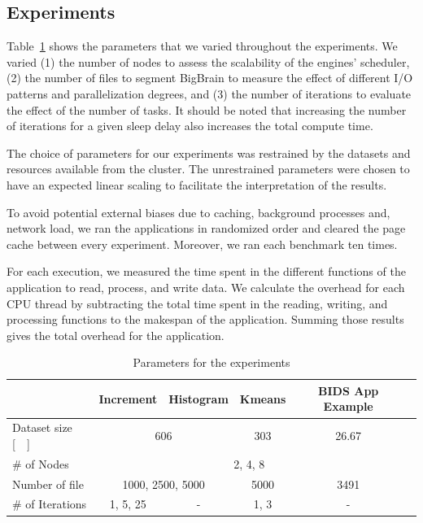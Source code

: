 \documentclass[AMA,STIX1COL]{WileyNJD-v2}
\newcommand{\HL}[1]{#1}
\begin{document}
\subsection{Experiments}
Table~\ref{table:parameters} shows the parameters that we varied
throughout the experiments. We varied (1) the number of nodes to assess
the scalability of the engines' scheduler, (2) the number of files \HL{to segment}
BigBrain to measure the effect of different I/O patterns and parallelization degrees, and (3) the
number of iterations to evaluate the effect of the number of tasks.
It should be noted that increasing the number of iterations for a given sleep 
delay also increases the total compute time.
\HL{
	The choice of parameters for our experiments was restrained by the datasets
	and resources available from the cluster.
	The unrestrained parameters were chosen to have an expected linear scaling
	to facilitate the interpretation of the results.
}
												
To avoid potential external biases due to caching, background processes and,
network load, we ran the applications in randomized order and cleared the
page cache between every experiment.
Moreover, we ran each benchmark ten times.
												
For each execution, we measured the time spent in the different functions of the
application to read, process, and write data.
We calculate the overhead for each CPU thread by subtracting the total time
spent in the reading, writing, and processing functions to the makespan of the application.
Summing those results gives the total overhead for the application.
												
\begin{table}[t]
	\renewcommand{\arraystretch}{1.5}
	\caption{Parameters for the experiments}\label{table:parameters}
	\centering
	\begin{tabular}{|l|c|c|c|c|c|}
		\hline           & Increment & Histogram & Kmeans & BIDS App Example \\\hline
		Dataset size [\SI{}{\gibi\byte}] &\multicolumn{2}{c|}{606} & 303 & \multicolumn{1}{c|}{26.67} \\\hline
		\# of Nodes & \multicolumn{4}{c|}{2, 4, 8} \\\hline
		Number of file & \multicolumn{2}{c|}{1000, 2500, 5000} & 5000 & \multicolumn{1}{c|}{3491} \\\hline
		\# of Iterations & 1, 5, 25  & -         & 1, 3   & -                \\\hline
	\end{tabular}
\end{table}
												
\end{document}
